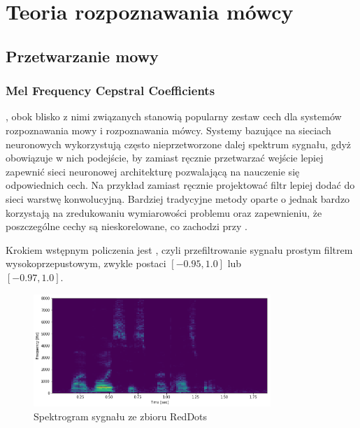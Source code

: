 \chapter{Teoria rozpoznawania mówcy}\label{chap:teoria}

\section{Przetwarzanie mowy}\label{sec:przetwarzanie_mowy}

\subsection{Mel Frequency Cepstral Coefficients}\label{sec:mfcc}

, obok blisko z nimi związanych  stanowią popularny zestaw 
cech dla systemów rozpoznawania mowy i rozpoznawania mówcy. Systemy bazujące na sieciach
neuronowych wykorzystują często nieprzetworzone dalej spektrum sygnału, gdyż obowiązuje
w nich podejście, by zamiast ręcznie przetwarzać wejście lepiej zapewnić sieci neuronowej
architekturę pozwalającą na nauczenie się odpowiednich cech. Na przykład zamiast ręcznie
projektować filtr lepiej dodać do sieci warstwę konwolucyjną. Bardziej tradycyjne metody
oparte o  jednak bardzo korzystają na zredukowaniu wymiarowości problemu
oraz zapewnieniu, że poszczególne cechy są nieskorelowane, co zachodzi przy .

Krokiem wstępnym policzenia  jest , czyli przefiltrowanie sygnału 
prostym filtrem wysokoprzepustowym, zwykle postaci $[-0.95, 1.0]$ lub \\ $[-0.97, 1.0]$.

\begin{figure}[H]
    \centering
    \includegraphics[width=0.8\textwidth]{images/2_1_a_example_spectrogram}
    \caption{Spektrogram sygnału  ze zbioru RedDots}
    \label{fig:2_1_a_example_spectrogram}
\end{figure}

